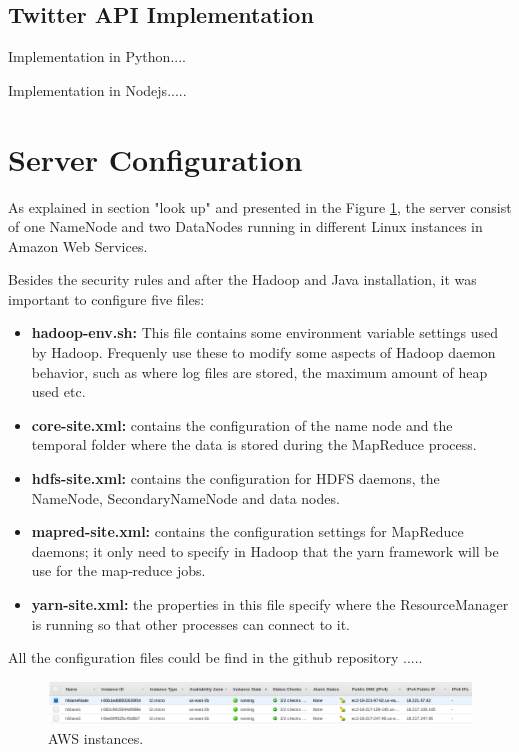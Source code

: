 \documentclass{article}
\newcommand*\setcaptioncitation[1]{\def\captioncitation{\textit{Source:}~#1}}
\let\captioncitation\relax
\begin{document}
        \subsection{Twitter API Implementation}

        Implementation in Python....

        Implementation in Nodejs.....
        \section{Server Configuration}

        As  explained in section "look up" and presented in the Figure \ref{}, the server consist of one NameNode and two DataNodes running in different Linux instances in Amazon Web Services.

        Besides the security rules and after the Hadoop and Java installation, it was important to configure five files:
            \begin{itemize}
                \item \textbf{hadoop-env.sh:} This file contains some environment variable settings used by Hadoop. Frequenly use these to modify some aspects of Hadoop daemon behavior, such as where log files are stored, the maximum amount of heap used etc.                
                \item \textbf{core-site.xml:} contains the configuration of the name node and the temporal folder where the data is stored during the MapReduce process.
                \item \textbf{hdfs-site.xml:} contains the configuration for HDFS daemons, the NameNode, SecondaryNameNode  and data nodes.
                \item \textbf{mapred-site.xml:} contains the configuration settings for MapReduce daemons; it only need to specify in Hadoop that the yarn framework will be use for the map‐reduce jobs.
                \item \textbf{yarn-site.xml:} the properties in this file specify where the ResourceManager is running so that other processes can connect to it.
            \end{itemize}
        All the configuration files could be find in the github repository .....
        \begin{figure}[H]
            \centering 
            \includegraphics[width=1\linewidth]{./img/instances.png}
            \setcaptioncitation{Screenshot idk.}
            \caption{AWS instances.}
            \label{fig:instances}
        \end{figure}
\end{document}
